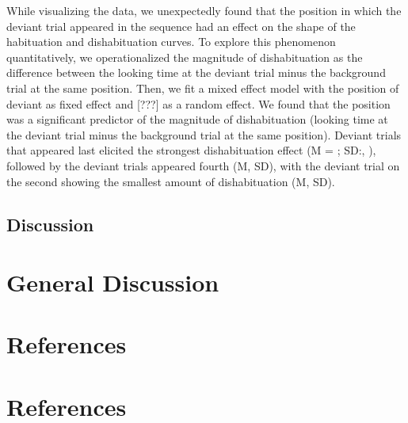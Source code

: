 \documentclass[10pt, letterpaper]{article}
\begin{document}
While visualizing the data, we unexpectedly found that the position in
which the deviant trial appeared in the sequence had an effect on the
shape of the habituation and dishabituation curves. To explore this
phenomenon quantitatively, we operationalized the magnitude of
dishabituation as the difference between the looking time at the deviant
trial minus the background trial at the same position. Then, we fit a
mixed effect model with the position of deviant as fixed effect and
{[}???{]} as a random effect. We found that the position was a
significant predictor of the magnitude of dishabituation (looking time
at the deviant trial minus the background trial at the same position).
Deviant trials that appeared last elicited the strongest dishabituation
effect (M = ; SD:, ), followed by the deviant trials appeared fourth (M,
SD), with the deviant trial on the second showing the smallest amount of
dishabituation (M, SD).

\hypertarget{discussion}{%
\subsection{Discussion}\label{discussion}}

\hypertarget{general-discussion}{%
\section{General Discussion}\label{general-discussion}}

\hypertarget{references}{%
\section{References}\label{references}}

\hypertarget{references-1}{%
\section{References}\label{references-1}}

\setlength{\parindent}{-0.1in} 
\setlength{\leftskip}{0.125in}

\noindent


\end{document}
